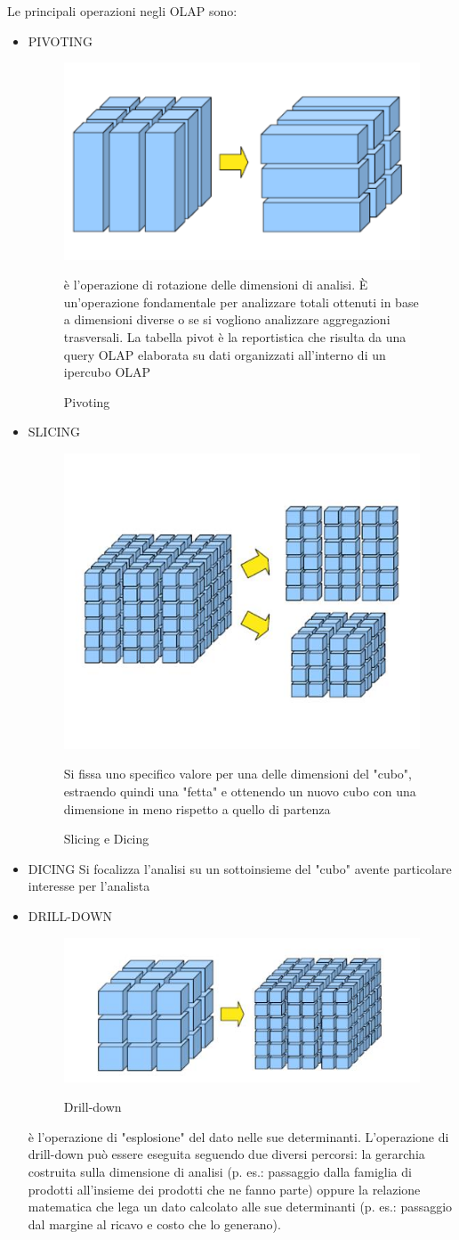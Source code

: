 Le principali operazioni negli OLAP sono:
\begin{itemize}
    \item PIVOTING
    \begin{figure}[H]
        \centering
        \includegraphics[width=0.2\linewidth]{imgs/5 - pivoting}
        \label{fig:pivoting}
        \caption{Pivoting}
        è l'operazione di rotazione delle dimensioni di analisi. È un'operazione
        fondamentale per analizzare totali ottenuti in base a dimensioni diverse o
        se si vogliono analizzare aggregazioni trasversali.
        La tabella pivot è la reportistica che risulta da una query OLAP elaborata
        su dati organizzati all'interno di un ipercubo OLAP
    \end{figure}
    \item SLICING
    \begin{figure}[H]
        \centering
        \includegraphics[width=0.2\linewidth]{imgs/6 - slicing - dicing}
        \label{fig:slicing-dicing}
        \caption{Slicing e Dicing}
        Si fissa uno specifico valore per una delle
        dimensioni del "cubo", estraendo quindi una
        "fetta" e ottenendo un nuovo cubo con una
        dimensione in meno rispetto a quello di
        partenza
    \end{figure}
    \item DICING
    Si focalizza l’analisi su un sottoinsieme del
    "cubo" avente particolare interesse per
    l'analista
    \item DRILL-DOWN
    \begin{figure}[H]
        \centering
        \includegraphics[width=0.3\linewidth]{imgs/7 - drill down}
        \label{fig:drill_down}
        \caption{Drill-down}
    \end{figure}
    è l'operazione di "esplosione" del dato nelle sue determinanti.
    L'operazione di drill-down può essere eseguita seguendo due diversi
    percorsi: la gerarchia costruita sulla dimensione di analisi (p. es.:
    passaggio dalla famiglia di prodotti all'insieme dei prodotti che ne fanno
    parte) oppure la relazione matematica che lega un dato calcolato alle sue
    determinanti (p. es.: passaggio dal margine al ricavo e costo che lo
    generano).
\end{itemize}



